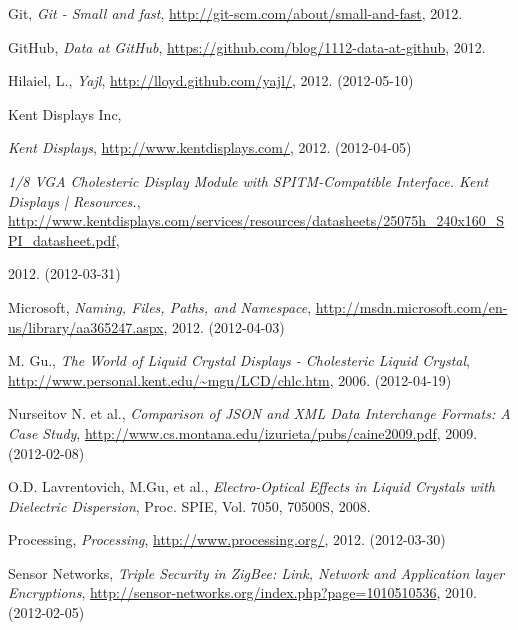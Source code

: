 \documentclass[a4paper,11pt]{article}
\newcounter{qcounter}
\begin{document}
\begin{thebibliography}{9}
\label{git}
    Git, 
    \emph{Git - Small and fast},
    \url{http://git-scm.com/about/small-and-fast},
    2012.

\label{github}
    GitHub,
    \emph{Data at GitHub},
    \url{https://github.com/blog/1112-data-at-github},
    2012.

\label{hilaiel}
    Hilaiel, L.,
    \emph{Yajl},
    \url{http://lloyd.github.com/yajl/},
    2012. (2012-05-10)

\label{kent}
    Kent Displays Inc,
    \begin{list}{[]}{}
    \item \emph{Kent Displays},
    \url{http://www.kentdisplays.com/},
    2012. (2012-04-05) \\
    \item \emph{1/8 VGA Cholesteric Display Module with SPITM-Compatible Interface. Kent Displays | Resources.},
    \url{http://www.kentdisplays.com/services/resources/datasheets/25075h_240x160_SPI_datasheet.pdf},
    \end{list}
     2012. (2012-03-31)

\label{microsoft}
    Microsoft,
    \emph{Naming, Files, Paths, and Namespace},
    \url{http://msdn.microsoft.com/en-us/library/aa365247.aspx},
    2012. (2012-04-03)

\label{mingu}
    M. Gu.,
    \emph{The World of Liquid Crystal Displays - Cholesteric Liquid Crystal},
    \url{http://www.personal.kent.edu/~mgu/LCD/chlc.htm},
    2006. (2012-04-19)

\label{paulson}
    Nurseitov N. et al.,
    \emph{Comparison of JSON and XML Data Interchange Formats: A Case Study},
    \url{http://www.cs.montana.edu/izurieta/pubs/caine2009.pdf},
    2009. (2012-02-08)

\label{lavrentovich}
    O.D. Lavrentovich, M.Gu, et al.,
    \emph{Electro-Optical Effects in Liquid Crystals with Dielectric Dispersion},
    Proc. SPIE, 
    Vol. 7050, 70500S,
    2008.

\label{processing}
    Processing,
    \emph{Processing},
    \url{http://www.processing.org/},
    2012. (2012-03-30)

\label{sensornetworks}
    Sensor Networks,
    \emph{Triple Security in ZigBee: Link, Network and Application layer Encryptions},
    \url{http://sensor-networks.org/index.php?page=1010510536},
    2010. (2012-02-05)


\end{thebibliography}
\end{document}
